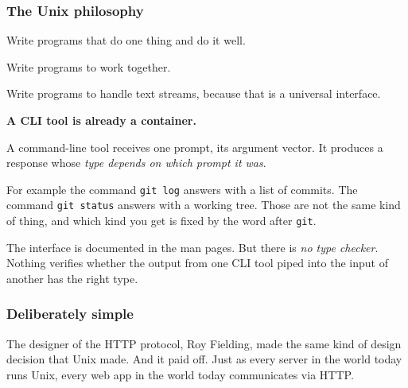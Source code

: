 \documentclass[aspectratio=169,12pt]{beamer}
\begin{document}
\begin{frame}
\frametitle{The Unix philosophy}
\vfill
\begin{center}
\begin{minipage}{0.86\textwidth}
\centering
\Large

Write programs that do one thing and do it well.

\medskip

Write programs to work together.

\medskip

Write programs to handle text streams, because that is a universal interface.

\end{minipage}
\end{center}
\vfill
\end{frame}

\begin{frame}
\vfill
\begin{center}
\begin{minipage}{0.92\textwidth}
\raggedright
\large

\textbf{A CLI tool is already a container.}

\medskip

A command-line tool receives one prompt, its argument vector. It produces a response whose
\emph{type depends on which prompt it was}.

\medskip

For example the command \texttt{git log} answers with a list of commits. The command
\texttt{git status} answers with a working tree. Those are not the same kind of thing, and which
kind you get is fixed by the word after \texttt{git}.

\medskip

The interface is documented in the man pages. But there is \emph{no type checker}. Nothing
verifies whether the output from one CLI tool piped into the input of another has the right type.

\end{minipage}
\end{center}
\vfill
\end{frame}

\begin{frame}
\frametitle{Deliberately simple}
\vfill
\begin{center}
\begin{minipage}{0.92\textwidth}
\raggedright
\large

The designer of the HTTP protocol, Roy Fielding, made the same kind of design decision that Unix
made. And it paid off. Just as every server in the world today runs Unix, every web app in the
world today communicates via HTTP.

\end{minipage}
\end{center}
\vfill
\end{frame}
\end{document}
